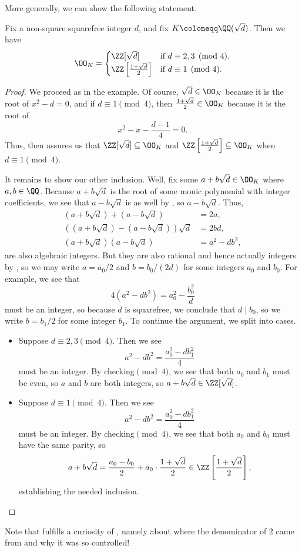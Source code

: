 \documentclass[../notes.tex]{subfiles}
\begin{document}
More generally, we can show the following statement.
\begin{proposition} \label{prop:quad-o-k}
	Fix a non-square squarefree integer $d$, and fix $K\coloneqq\QQ(\sqrt d)$. Then we have
	\[\OO_K=\begin{cases}
		\ZZ[\sqrt d] & \text{if }d\equiv2,3\pmod4, \\
		\ZZ\left[\frac{1+\sqrt d}2\right] & \text{if }d\equiv1\pmod4.
	\end{cases}\]
\end{proposition}
\begin{proof}
	We proceed as in the example. Of course, $\sqrt d\in\OO_K$ because it is the root of $x^2-d=0$, and if $d\equiv1\pmod4$, then $\frac{1+\sqrt d}2\in\OO_K$ because it is the root of
	\[x^2-x-\frac{d-1}4=0.\]
	Thus,  then assures us that $\ZZ[\sqrt d]\subseteq\OO_K$ and $\ZZ\left[\frac{1+\sqrt d}2\right]\subseteq\OO_K$ when $d\equiv1\pmod4$.

	It remains to show our other inclusion. Well, fix some $a+b\sqrt d\in\OO_K$ where $a,b\in\QQ$. Because $a+b\sqrt d$ is the root of some monic polynomial with integer coefficients, we see that $a-b\sqrt d$ is as well by , so $a-b\sqrt d$. Thus,
	\begin{align*}
		(a+b\sqrt d)+(a-b\sqrt d)&=2a, \\
		\left((a+b\sqrt d)-(a-b\sqrt d)\right)\sqrt d&=2bd, \\
		(a+b\sqrt d)(a-b\sqrt d)&=a^2-db^2,
	\end{align*}
	are also algebraic integers. But they are also rational and hence actually integers by , so we may write $a=a_0/2$ and $b=b_0/(2d)$ for some integers $a_0$ and $b_0$. For example, we see that
	\[4\left(a^2-db^2\right)=a_0^2-\frac{b_0^2}{d}\]
	must be an integer, so because $d$ is squarefree, we conclude that $d\mid b_0$, so we write $b=b_1/2$ for some integer $b_1$. To continue the argument, we split into cases.
	\begin{itemize}
		\item Suppose $d\equiv2,3\pmod4$. Then we see
		\[a^2-db^2=\frac{a_0^2-db_1^2}{4}\]
		must be an integer. By checking$\pmod4$, we see that both $a_0$ and $b_1$ must be even, so $a$ and $b$ are both integers, so $a+b\sqrt d\in\ZZ[\sqrt d]$.
		\item Suppose $d\equiv1\pmod4$. Then we see
		\[a^2-db^2=\frac{a_0^2-db_1^2}{4}\]
		must be an integer. By checking$\pmod4$, we see that both $a_0$ and $b_0$ must have the same parity, so
		\[a+b\sqrt d=\frac{a_0-b_0}2+a_0\cdot\frac{1+\sqrt d}2\in\ZZ\left[\frac{1+\sqrt d}2\right],\]
		establishing the needed inclusion.
		\qedhere
	\end{itemize}
\end{proof}
Note that  fulfills a curiosity of , namely about where the denominator of $2$ came from and why it was so controlled!
\end{document}

